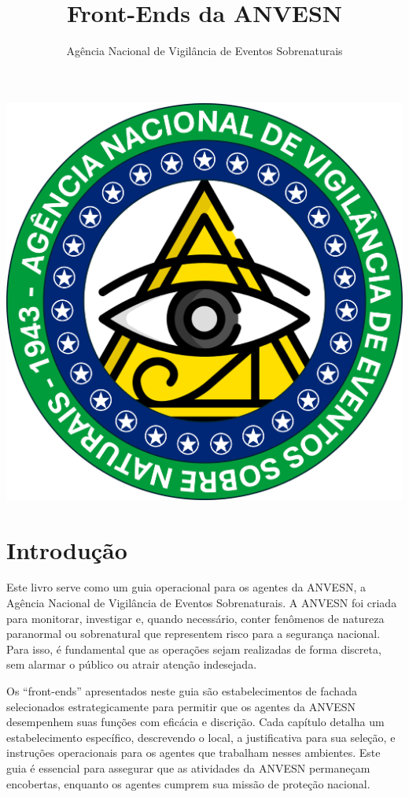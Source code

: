 \documentclass{book}
\title{Front-Ends da ANVESN}
\author{Agência Nacional de Vigilância de Eventos Sobrenaturais}
\date{}
\begin{document}
\maketitle

\begin{center}
\newpage
\vspace*{\fill}
\includegraphics[scale=.9]{imagens/ANVESN_LOGO.png}
\vspace*{\fill}
\newpage
\end{center}

\frontmatter
\chapter*{Introdução}
Este livro serve como um guia operacional para os agentes da ANVESN, a Agência Nacional de Vigilância de Eventos Sobrenaturais. A ANVESN foi criada para monitorar, investigar e, quando necessário, conter fenômenos de natureza paranormal ou sobrenatural que representem risco para a segurança nacional. Para isso, é fundamental que as operações sejam realizadas de forma discreta, sem alarmar o público ou atrair atenção indesejada.

Os ``front-ends'' apresentados neste guia são estabelecimentos de fachada selecionados estrategicamente para permitir que os agentes da ANVESN desempenhem suas funções com eficácia e discrição. Cada capítulo detalha um estabelecimento específico, descrevendo o local, a justificativa para sua seleção, e instruções operacionais para os agentes que trabalham nesses ambientes. Este guia é essencial para assegurar que as atividades da ANVESN permaneçam encobertas, enquanto os agentes cumprem sua missão de proteção nacional.
\end{document}
